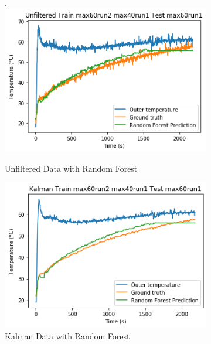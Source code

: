 \begin{figure}[ht]
    \begin{subfigure}{.34\linewidth}.
        \centering
    	\includegraphics[width=\linewidth]{filter/unfiltered_RF.png}
        \caption{Unfiltered Data with Random Forest}
    \end{subfigure}
    \begin{subfigure}{.34\linewidth}
    	\centering
    	\includegraphics[width=\linewidth]{filter/kalman_RF.png}
        \caption{Kalman Data with Random Forest}
    \end{subfigure}
    \begin{subfigure}{.34\linewidth}
    	\centering

\end{subfigure}
\end{figure}
